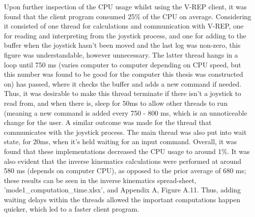 \documentclass[12pt,openany,a4paper]{book}
\begin{document}
Upon further inspection of the CPU usage whilst using the V-REP client, it was found that the client program consumed 25\% of the CPU on average. Considering it consisted of one thread for calculations and communication with V-REP, one for reading and interpreting from the joystick process, and one for adding to the buffer when the joystick hasn't been moved and the last log was non-zero, this figure was understandable, however unnecessary. The latter thread hangs in a loop until 750 ms (varies computer to computer depending on CPU speed, but this number was found to be good for the computer this thesis was constructed on) has passed, where it checks the buffer and adds a new command if needed. Thus, it was desirable to make this thread terminate if there isn't a joystick to read from, and when there is, sleep for 50ms to allow other threads to run (meaning a new command is added every 750 - 800 ms, which is an unnoticeable change for the user. A similar outcome was made for the thread that communicates with the joystick process. The main thread was also put into wait state, for 20ms, when it's held waiting for an input command. Overall, it was found that these implementations decreased the CPU usage to around 1\%. It was also evident that the inverse kinematics calculations were performed at around 580 ms (depends on computer CPU), as opposed to the prior average of 680 ms; these results can be seen in the inverse kinematics spread-sheet, 'mode1\_computation\_time.xlsx', and Appendix A, Figure A.11. Thus, adding waiting delays within the threads allowed the important computations happen quicker, which led to a faster client program.
\end{document}
